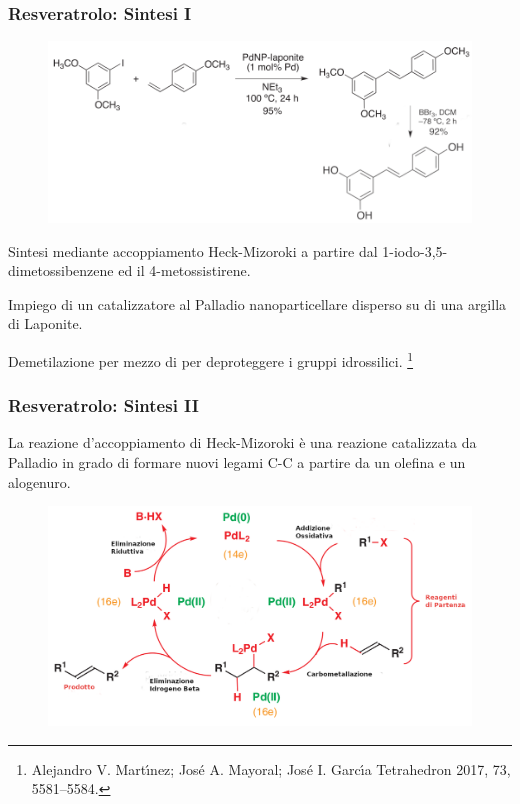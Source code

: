 \documentclass[9pt]{beamer}
\newcommand\blfootnote[1]{%
	\begingroup
	\renewcommand\thefootnote{}\footnote{#1}%
	\addtocounter{footnote}{-1}%
	\endgroup
}
\begin{document}
\begin{frame}
	\frametitle{Resveratrolo: Sintesi I}
	\begin{figure}
		\includegraphics{immagini/totale_resveratrolo.png}
	\end{figure}
	Sintesi mediante accoppiamento Heck-Mizoroki a partire dal 1-iodo-3,5-dimetossibenzene ed il 4-metossistirene.
	
	Impiego di un catalizzatore al Palladio nanoparticellare disperso su di una argilla di Laponite.
	
	Demetilazione per mezzo di  per deproteggere i gruppi idrossilici.
	\blfootnote{Alejandro V. Martı́nez; José A. Mayoral; José I. Garcı́a Tetrahedron 2017, 73, 5581–5584.}
\end{frame}

\begin{frame}
	\frametitle{Resveratrolo: Sintesi II}
	\bigskip
	La reazione d'accoppiamento di Heck-Mizoroki è una reazione catalizzata da Palladio in grado di formare nuovi legami C-C a partire da un olefina e un alogenuro.
	
	\begin{figure}
		\centering
		\includegraphics[width=\textwidth]{immagini/heck.png}
	\end{figure}
\end{frame}
\end{document}
